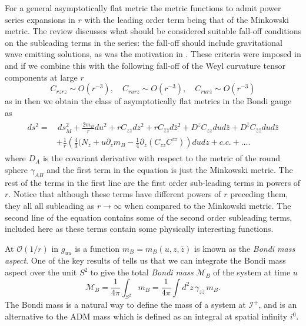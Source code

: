 \documentclass[a4paper,11pt]{article}
\numberwithin{equation}{section}
\begin{document}
For a general asymptotically flat metric the metric functions to admit power series expansions in $r$ with the leading order term being that of the Minkowski metric. The review \cite{Strominger:2017zoo} discusses what should be considered suitable fall-off conditions on the subleading terms in the series: the fall-off should include gravitational wave emitting solutions, as was the motivation in \cite{Bondi:1962px}. These criteria were imposed in \cite{Bondi:1962px, Sachs:1962wk} and if we combine this with the following fall-off of the Weyl curvature tensor components at large $r$
\begin{equation}
C_{rzrz} \sim O(r^{-3}), \quad C_{rurz} \sim O(r^{-3}), \quad C_{rur\bar{z}} \sim O(r^{-3})
\end{equation}
as in \cite{Strominger:2017zoo} then we obtain the class of asymptotically flat metrics in the Bondi gauge as 
\begin{align}
\begin{split}
ds^2=&\, ds_{M}^2+\frac{2m_B}{r}du^2+rC_{zz}dz^2+rC_{\bar{z} \bar{z}}d\bar{z}^2+D^zC_{zz}dud\bar{z}+D^{\bar{z}}C_{\bar{z}\bar{z}}dud\bar{z} \\
& +\frac{1}{r}\left(\frac{4}{3}(N_z+u\partial_z m_B -\frac{1}{4}\partial_z(C_{zz}C^{zz})\right)dudz + c.c.+ \ldots.
\end{split}
\end{align}
where $D_A$ is the covariant derivative with respect to the metric of the round sphere $\gamma_{AB}$ and the first term in the equation is just the Minkowski metric. The rest of the terms in the first line are the first order sub-leading terms in powers of $r$. Notice that although these terms have different powers of $r$ preceding them, they all all subleading as $r \rightarrow \infty$ when compared to the Minkowski metric. The second line of the equation contains some of the second order subleading terms, included here as these terms contain some physically interesting functions. \par

At $\mathcal{O}(1/r)$ in $g_{uu}$ is a function $m_B=m_B(u,z,\bar{z})$ is known as the \textit{Bondi mass aspect}. One of the key results of \cite{Bondi:1962px} tells us that we can integrate the Bondi mass aspect over the unit $S^2$ to give the total \textit{Bondi mass} $\mathcal{M}_B$ of the system at time $u$ 
\begin{equation} \label{eq: Bondi_mass_time_u}
\mathcal{M}_B=\frac{1}{4\pi}\int_{S^2} m_B=\frac{1}{4\pi}\int d^2z \, \gamma_{z\bar{z}} \, m_B. 
\end{equation}
The Bondi mass is a natural way to define the mass of a system at $\mathscr{I^+}$, and is an alternative to the ADM mass which is defined as an integral at spatial infinity $i^0$.  
\end{document}
